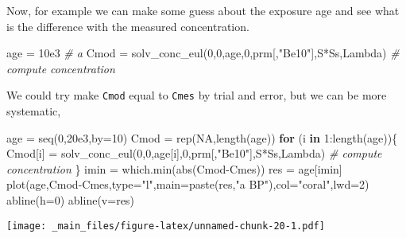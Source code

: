 \documentclass[
]{book}
\newenvironment{Shaded}{\begin{snugshade}}{\end{snugshade}}
\newcommand{\AttributeTok}[1]{\textcolor[rgb]{0.77,0.63,0.00}{#1}}
\newcommand{\CommentTok}[1]{\textcolor[rgb]{0.56,0.35,0.01}{\textit{#1}}}
\newcommand{\ConstantTok}[1]{\textcolor[rgb]{0.00,0.00,0.00}{#1}}
\newcommand{\ControlFlowTok}[1]{\textcolor[rgb]{0.13,0.29,0.53}{\textbf{#1}}}
\newcommand{\DecValTok}[1]{\textcolor[rgb]{0.00,0.00,0.81}{#1}}
\newcommand{\FloatTok}[1]{\textcolor[rgb]{0.00,0.00,0.81}{#1}}
\newcommand{\FunctionTok}[1]{\textcolor[rgb]{0.00,0.00,0.00}{#1}}
\newcommand{\NormalTok}[1]{#1}
\newcommand{\OtherTok}[1]{\textcolor[rgb]{0.56,0.35,0.01}{#1}}
\newcommand{\SpecialCharTok}[1]{\textcolor[rgb]{0.00,0.00,0.00}{#1}}
\newcommand{\StringTok}[1]{\textcolor[rgb]{0.31,0.60,0.02}{#1}}
\begin{document}
Now, for example we can make some guess about the exposure age and see what is the difference with the measured concentration.

\begin{Shaded}
\begin{Highlighting}[]
\NormalTok{age }\OtherTok{=} \FloatTok{10e3} \CommentTok{\# a }
\NormalTok{Cmod }\OtherTok{=} \FunctionTok{solv\_conc\_eul}\NormalTok{(}\DecValTok{0}\NormalTok{,}\DecValTok{0}\NormalTok{,age,}\DecValTok{0}\NormalTok{,prm[,}\StringTok{"Be10"}\NormalTok{],S}\SpecialCharTok{*}\NormalTok{Ss,Lambda) }\CommentTok{\# compute concentration}
\end{Highlighting}
\end{Shaded}

We could try make \texttt{Cmod} equal to \texttt{Cmes} by trial and error, but we can be more systematic,

\begin{Shaded}
\begin{Highlighting}[]
\NormalTok{age }\OtherTok{=} \FunctionTok{seq}\NormalTok{(}\DecValTok{0}\NormalTok{,}\FloatTok{20e3}\NormalTok{,}\AttributeTok{by=}\DecValTok{10}\NormalTok{)}
\NormalTok{Cmod }\OtherTok{=} \FunctionTok{rep}\NormalTok{(}\ConstantTok{NA}\NormalTok{,}\FunctionTok{length}\NormalTok{(age))}
\ControlFlowTok{for}\NormalTok{ (i }\ControlFlowTok{in} \DecValTok{1}\SpecialCharTok{:}\FunctionTok{length}\NormalTok{(age))\{}
\NormalTok{  Cmod[i] }\OtherTok{=} \FunctionTok{solv\_conc\_eul}\NormalTok{(}\DecValTok{0}\NormalTok{,}\DecValTok{0}\NormalTok{,age[i],}\DecValTok{0}\NormalTok{,prm[,}\StringTok{"Be10"}\NormalTok{],S}\SpecialCharTok{*}\NormalTok{Ss,Lambda) }\CommentTok{\# compute concentration}
\NormalTok{\}}
\NormalTok{imin }\OtherTok{=} \FunctionTok{which.min}\NormalTok{(}\FunctionTok{abs}\NormalTok{(Cmod}\SpecialCharTok{{-}}\NormalTok{Cmes))}
\NormalTok{res }\OtherTok{=}\NormalTok{ age[imin]}
\FunctionTok{plot}\NormalTok{(age,Cmod}\SpecialCharTok{{-}}\NormalTok{Cmes,}\AttributeTok{type=}\StringTok{"l"}\NormalTok{,}\AttributeTok{main=}\FunctionTok{paste}\NormalTok{(res,}\StringTok{"a BP"}\NormalTok{),}\AttributeTok{col=}\StringTok{"coral"}\NormalTok{,}\AttributeTok{lwd=}\DecValTok{2}\NormalTok{)}
\FunctionTok{abline}\NormalTok{(}\AttributeTok{h=}\DecValTok{0}\NormalTok{)}
\FunctionTok{abline}\NormalTok{(}\AttributeTok{v=}\NormalTok{res)}
\end{Highlighting}
\end{Shaded}

\texttt{[image: \_main\_files/figure-latex/unnamed-chunk-20-1.pdf]}
\end{document}
